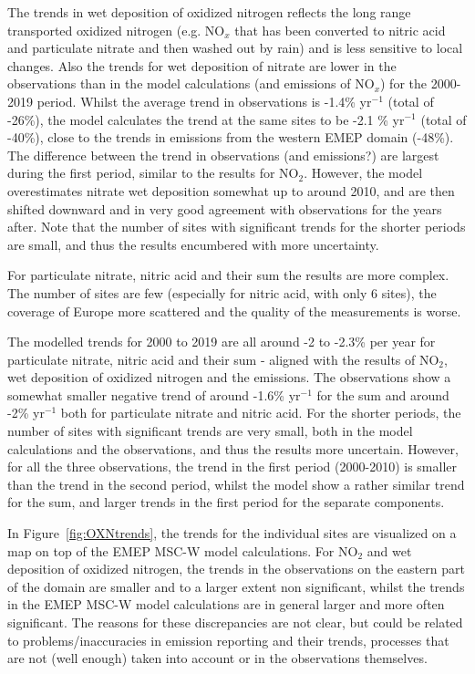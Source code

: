 The trends in wet deposition of oxidized nitrogen reflects the long range transported oxidized nitrogen (e.g. NO$_x$ that has been converted to nitric acid and particulate nitrate and then washed out by rain) and is less sensitive to local changes. Also the trends for wet deposition of nitrate are lower in the observations than in the model calculations (and emissions of NO$_x$) for the 2000-2019 period. Whilst the average trend in observations is -1.4\% yr$^{-1}$ (total of -26\%), the model calculates the trend at the same sites to be -2.1 \% yr$^{-1}$ (total of -40\%), close to the trends in emissions from the western EMEP domain (-48\%). The difference between the trend in observations (and emissions?) are largest during the first period, similar to the results for NO$_2$. However, the model overestimates nitrate wet deposition somewhat up to around 2010, and are then shifted downward and in very good agreement with observations for the years after. Note that the number of sites with significant trends for the shorter periods are small, and thus the results encumbered with more uncertainty.

For particulate nitrate, nitric acid and their sum the results are more complex. The number of sites are few (especially for nitric acid, with only 6 sites), the coverage of Europe more scattered and the quality of the measurements is worse. 

The modelled trends for 2000 to 2019 are all around -2 to -2.3\% per year for particulate nitrate, nitric acid and their sum - aligned with the results of NO$_2$, wet deposition of oxidized nitrogen and the emissions. The observations show a somewhat smaller negative trend of around -1.6\% yr$^{-1}$ for the sum and around -2\% yr$^{-1}$ both for particulate nitrate and nitric acid. For the shorter periods, the number of sites with significant trends are very small, both in the model calculations and the observations, and thus the results more uncertain.
However, for all the three observations, the trend in the first period (2000-2010) is smaller than the trend in the second period, whilst the model show a rather similar trend for the sum, and larger trends in the first period for the separate components.

In Figure~\ref{fig:OXNtrends}, the trends for the individual sites are visualized on a map on top of the EMEP MSC-W model calculations. For NO$_2$ and wet deposition of oxidized nitrogen, the trends in the observations on the eastern part of the domain are smaller and to a larger extent non significant, whilst the trends in the EMEP MSC-W model calculations are in general larger and more often significant. The reasons for these discrepancies are not clear, but could be related to problems/inaccuracies in emission reporting and their trends, processes that are not (well enough) taken into account or in the observations themselves.

